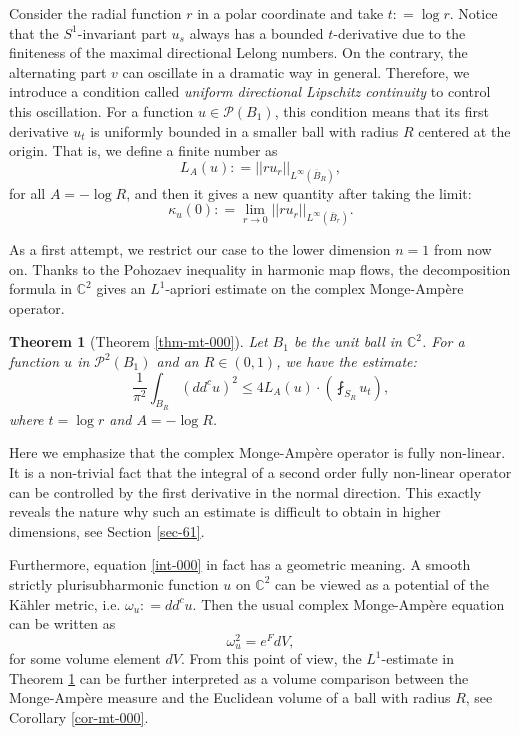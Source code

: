 \documentclass[a4paper,11pt]{amsart}
\numberwithin{equation}{section}
\newtheorem{theorem}{Theorem}[section]
\def\cP{{\mathcal P}}
\def\cP{{\mathcal P}}
\def\bC{{\mathbb C}}
\def\k{{\kappa}}
\begin{document}
Consider the radial function $r$ in a polar coordinate and take $t: = \log r$. 
Notice that the $S^1$-invariant part $u_s$ always has a bounded $t$-derivative
due to the finiteness of the maximal directional Lelong numbers. 
On the contrary, the alternating part $v$ can oscillate in a dramatic way in general. 
Therefore, 
we introduce a condition called  \emph{uniform directional Lipschitz continuity} to control this oscillation. 
For a function $u\in \cP(B_1)$, 
this condition  
means that its first derivative $u_t $ is uniformly bounded in a smaller ball with radius $R$ centered at the origin.
That is, we define a finite number as 
\begin{equation}
L_A(u): = || r u_r ||_{L^{\infty}(\overline{B}_R)},
\end{equation}
for all $A = -\log R$, and then it gives a new quantity after taking the limit:
\begin{equation}
\k_u(0): = \lim_{r \rightarrow 0} || r u_r ||_{L^{\infty}(\overline{B}_r)}.
\end{equation}

As a first attempt, 
we restrict our case to the lower dimension $n=1$ from now on. 
Thanks to the Pohozaev inequality \cite{LW98} in harmonic map flows, 
the decomposition formula in $\bC^2$
gives an $L^1$-apriori estimate on the complex Monge-Amp\`ere operator.

\begin{theorem}[Theorem \ref{thm-mt-000}]
\label{thm-int-000}
Let $B_1$ be the unit ball in $\bC^2$. 
For a function $u$ in $\cP^{2}(B_1)$ and an $R\in (0,1)$, 
we have the estimate: 
\begin{equation}
\label{int-000}
\frac{1}{\pi^2}\int_{B_R} (dd^c u)^2 \leq 4 L_A(u)\cdot \left( \fint_{S_R} u_t \right), 
\end{equation}
where $t=\log r $ and  $A= -\log R$. 
\end{theorem}

Here we emphasize that the complex Monge-Amp\`ere operator is fully non-linear. 
It is a non-trivial fact that the integral of a second order fully non-linear operator 
can be controlled by the first derivative in the normal direction. 
This exactly reveals the nature why such an estimate is difficult to obtain in higher dimensions, 
see Section \ref{sec-61}.

Furthermore, equation \eqref{int-000} in fact has a geometric meaning. 
A smooth strictly plurisubharmonic function $u$ on $\bC^2$ 
can be viewed as a potential of the K\"ahler metric, i.e. $\omega_u: = dd^c u$. 
Then the usual complex Monge-Amp\`ere equation can be written as 
$$ \omega^2_u = e^F dV,$$
for some volume element $dV$.
From this point of view, 
the $L^1$-estimate in Theorem \ref{thm-int-000}
can be further interpreted as a volume comparison 
between the Monge-Amp\`ere measure and the Euclidean volume of a ball with radius $R$, 
see Corollary \ref{cor-mt-000}. 
\end{document}
